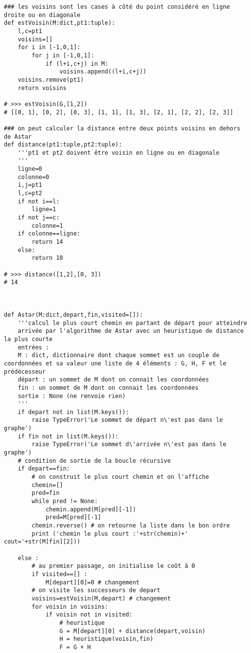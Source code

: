 \begin{lstlisting}
### les voisins sont les cases à côté du point considéré en ligne droite ou en diagonale
def estVoisin(M:dict,pt1:tuple):
    l,c=pt1
    voisins=[]
    for i in [-1,0,1]:
        for j in [-1,0,1]:
            if (l+i,c+j) in M:
                voisins.append((l+i,c+j))
    voisins.remove(pt1)
    return voisins

# >>> estVoisin(G,[1,2])
# [[0, 1], [0, 2], [0, 3], [1, 1], [1, 3], [2, 1], [2, 2], [2, 3]]

### on peut calculer la distance entre deux points voisins en dehors de Astar
def distance(pt1:tuple,pt2:tuple):
    '''pt1 et pt2 doivent être voisin en ligne ou en diagonale
    '''
    ligne=0
    colonne=0
    i,j=pt1
    l,c=pt2
    if not i==l:
        ligne=1
    if not j==c:
        colonne=1
    if colonne==ligne:
        return 14
    else:
        return 10

# >>> distance([1,2],[0, 3])
# 14



def Astar(M:dict,depart,fin,visited=[]):
    '''calcul le plus court chemin en partant de départ pour atteindre
    arrivée par l'algorithme de Astar avec un heuristique de distance la plus courte
    entrées :
    M : dict, dictionnaire dont chaque sommet est un couple de coordonnées et sa valeur une liste de 4 éléments : G, H, F et le prédécesseur
    départ : un sommet de M dont on connait les coordonnées
    fin : un sommet de M dont on connait les coordonnées
    sortie : None (ne renvoie rien)
    '''
    if depart not in list(M.keys()):
        raise TypeError('Le sommet de départ n\'est pas dans le graphe')
    if fin not in list(M.keys()):
        raise TypeError('Le sommet d\'arrivée n\'est pas dans le graphe')
    # condition de sortie de la boucle récursive
    if depart==fin:
        # on construit le plus court chemin et on l'affiche
        chemin=[]
        pred=fin
        while pred != None:
            chemin.append(M[pred][-1])
            pred=M[pred][-1]
        chemin.reverse() # on retourne la liste dans le bon ordre
        print ('chemin le plus court :'+str(chemin)+' cout='+str(M[fin][2]))

    else :
        # au premier passage, on initialise le coût à 0
        if visited==[] :
            M[depart][0]=0 # changement
        # on visite les successeurs de depart
        voisins=estVoisin(M,depart) # changement
        for voisin in voisins:
            if voisin not in visited:
                # heuristique
                G = M[depart][0] + distance(depart,voisin)
                H = heuristique(voisin,fin)
                F = G + H


\end{lstlisting}
